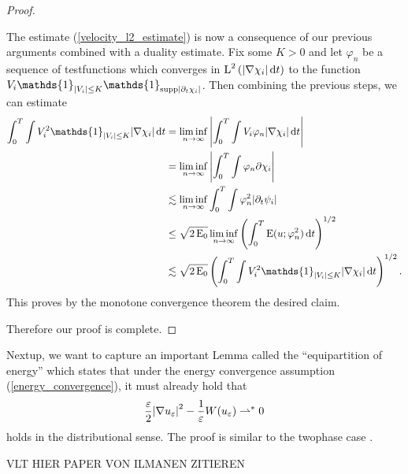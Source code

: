 \begin{proof}
\begin{description}[wide=0pt]
		The estimate (\ref{velocity_l2_estimate}) is now a consequence of our previous arguments combined with a duality estimate. Fix some $ K > 0 $ and let $ \varphi_{ n } $ be a sequence of testfunctions which converges in 
		$ \operatorname{L}^{ 2 } \left( \abs{ \nabla \chi_{ i } } \dd{ t } \right) $ to the function
		$ V_{ i } \mathds{ 1 }_{ \abs{ V_{ i } } \leq K } \mathds{ 1 }_{ \mathrm{supp} \abs{ \partial_{ t } \chi_{ i } } } $. Then combining the previous steps, we can estimate
		\begin{align*}
			\int_{ 0 }^{ T }
				\int
					V_{ i }^{ 2 } \mathds{ 1 }_{ \abs{ V_{ i } } \leq K }
				\abs{ \nabla \chi_{ i } }
			\dd{ t }
			& =
			\liminf_{ n \to \infty }
				\abs{
					\int_{ 0 }^{ T }
						\int
							V_{ i } \varphi_{ n } 
						\abs{ \nabla \chi_{ i } }
					\dd{ t }
				}
			\\
			& = 
			\liminf_{ n \to \infty }
				\abs{
					\int_{ 0 }^{ T }
						\int
							\varphi_{ n } \partial \chi_{ i }
				}
			\\
			& \lesssim
			\liminf_{ n \to \infty }
				\int_{ 0 }^{ T }
					\int
						\varphi_{ n }^{ 2 }
					\abs{ \partial_{ t } \psi_{ i } }
			\\
			& \leq
			\sqrt{ 2 \energy_{ 0 } }
			\liminf_{ n \to \infty }
				\left(
					\int_{ 0 }^{ T }
						\energy ( u ; \varphi_{ n }^{ 2 } )
					\dd{ t }
				\right)^{ 1/2 }
			\\
			& \lesssim
			\sqrt{ 2 \energy_{ 0 } }
			\left(
				\int_{ 0 }^{ T }
					\int
						V_{ i }^{ 2 }
						\mathds{ 1 }_{ \abs{ V_{ i } } \leq K }
					\abs{ \nabla \chi_{ i } }
				\dd{ t }
			\right)^{ 1 / 2 }.
		\end{align*}
		This proves by the monotone convergence theorem the desired claim.
	\end{description} 
	Therefore our proof is complete.
\end{proof}

Nextup, we want to capture an important Lemma called the \enquote{equipartition of energy} which states that under the energy convergence assumption (\ref{energy_convergence}), it must already hold that
\begin{equation*}
	\frac{ \varepsilon }{ 2 } \abs{ \nabla u_{ \varepsilon } }^{ 2 }
	-
	\frac{ 1 }{ \varepsilon } W ( u_{ \varepsilon } )
	\rightharpoonup^{ \ast }
	0
\end{equation*}
holds in the distributional sense. The proof is similar to the twophase case .

VLT HIER PAPER VON ILMANEN ZITIEREN


